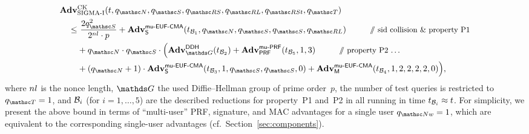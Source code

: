 \begin{align*}
	\Adv&^{\text{CK}}_{\mSIGMAI}(t, \qNewUser, \qSend, \qRevSessionKey, \qRevLongTermKey, \qRevState, \qTest)\\
		\leq
		&~ \frac{2 \qSend^2}{2^{\nl}\cdot p}				%
		+ \Adv^{\muEUFCMA}_{\SIGScheme}(t_{\advB_1}, \qNewUser, \qSend,\qSend, \qRevLongTermKey)
			\qquad \text{\comment{sid collision \& property~P1}}\\	%
		&+ \qNewUser \cdot \qSend \cdot \Big(
		\Adv^{\DDH}_{\group}(t_{\advB_2})				%
		+ \Adv^{\muPRFSEC}_{\PRF}(t_{\advB_5}, 1, 3)			%
			\qquad \text{\comment{property~P2 \dots}} \\		%
		&+ (\qNewUser + 1) \cdot \Adv^{\muEUFCMA}_{\SIGScheme}(t_{\advB_3}, 1, \qSend,\qSend, 0)	%
		+ \Adv^{\muEUFCMA}_{\MACScheme}(t_{\advB_4}, 1, 2,2,2, 2, 0)	%
		\Big),
\end{align*}
where
	$nl$ is the nonce length,
	$\group$ the used Diffie--Hellman group of prime order~$p$,
	the number of test queries is restricted to~$\qTest = 1$,
	and $\mathcal{B}_i$ (for $i = 1,\dots,5$) are the described reductions for property~P1 and~P2 in \cite[Theorem~6 in the full version]{C:CanKra02} all running in time $t_{\mathcal{B}_i} \approx t$.
For simplicity, we present the above bound in terms of ``multi-user'' PRF, signature, and MAC advantages for a single user $\qNew = 1$, which are equivalent to the corresponding single-user advantages  (cf.\ Section~\ref{sec:components}).

%
% 
% 
%  
%  
%  
%  
%  
%


